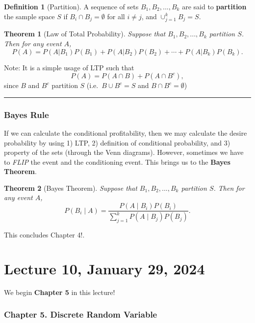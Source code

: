 \documentclass[
]{book}
\newtheorem{theorem}{Theorem}[chapter]
\theoremstyle{definition}
\newtheorem{definition}{Definition}[chapter]
\theoremstyle{definition}
\theoremstyle{definition}
\theoremstyle{definition}
\theoremstyle{remark}
\begin{document}
\begin{definition}[Partition]
A sequence of sets \(B_1,B_2,...,B_k\) are said to \textbf{partition} the sample space \(S\) if \(B_i \cap B_j = \emptyset\) for all \(i \ne j\), and \(\cup_{j=1}^k B_j = S\).
\end{definition}

\begin{theorem}[Law of Total Probability]
Suppose that \(B_1,B_2,...,B_k\) partition \(S\). Then for any event \(A\),
\[
P(A) = P(A | B_1) P(B_1) + P(A | B_2) P(B_2) + \cdots +P(A | B_k) P(B_k).
\]
\end{theorem}

Note: It is a simple usage of LTP such that
\[
  P(A) = P(A\cap B) + P(A \cap B^c),
\]
since \(B\) and \(B^c\) partition \(S\) (i.e.~\(B\cup B^c = S\) and \(B\cap B^c = \emptyset\))

\begin{center}\rule{0.5\linewidth}{0.5pt}\end{center}

\hypertarget{bayes-rule}{%
\subsection{Bayes Rule}\label{bayes-rule}}

If we can calculate the conditional profitability, then we may calculate the desire probability by using 1) LTP, 2) definition of conditional probability, and 3) property of the sets (through the Venn diagrams). However, sometimes we have to \emph{FLIP} the event and the conditioning event. This brings us to the \textbf{Bayes Theorem}.

\begin{theorem}[Bayes Theorem]
Suppose that \(B_1,B_2,...,B_k\) partition \(S\). Then for any event \(A\),
\[
P(B_i \mid A ) =  \frac{P(A \mid B_i)P(B_i)}{\sum_{j=1}^k P(A \mid B_j) P(B_j) }.
\]
\end{theorem}

This concludes Chapter 4!.

\hypertarget{lecture-10-january-29-2024}{%
\chapter{Lecture 10, January 29, 2024}\label{lecture-10-january-29-2024}}

We begin \textbf{Chapter 5} in this lecture!

\hypertarget{chapter-5.-discrete-random-variable}{%
\subsection{Chapter 5. Discrete Random Variable}\label{chapter-5.-discrete-random-variable}}
\end{document}

